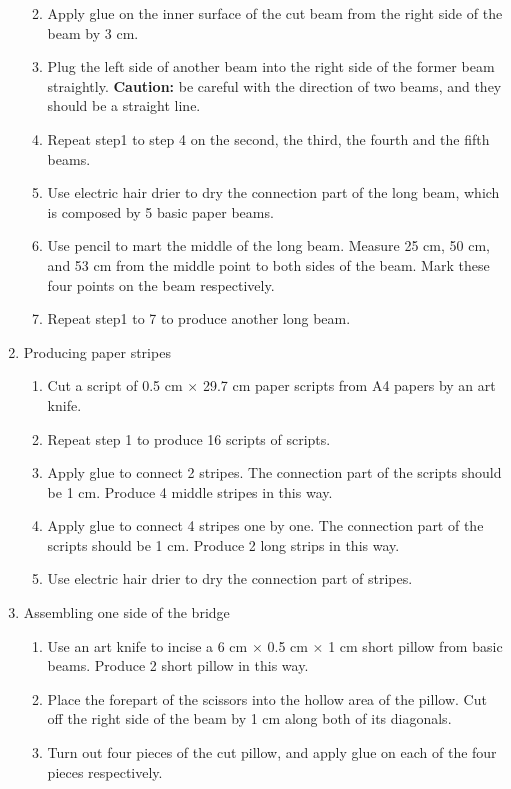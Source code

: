 \begin{enumerate}
\begin{enumerate}
\begin{figure}[H]
\begin{center}
	\end{center}
	\end{figure}
	\item Apply glue on the inner surface of the cut beam from the right side of the beam by 3 cm.
	\item Plug the left side of another beam into the right side of the former beam straightly. 
	\textbf{Caution:} be careful with the direction of two beams, and they should be a straight line. 
	\item Repeat step1 to step 4 on the second, the third, the fourth and the fifth beams. 
	\item Use electric hair drier to dry the connection part of the long beam, which is composed by 5 basic paper beams. 
	\item Use pencil to mart the middle of the long beam. Measure 25 cm, 50 cm, and 53 cm from the middle point to both sides of the beam. Mark these four points on the beam respectively. 
	\item Repeat step1 to 7 to produce another long beam. 
	\end{enumerate}
\item Producing paper stripes
	\begin{enumerate}
	\item Cut a script of 0.5 cm $\times$ 29.7 cm paper scripts from A4 papers by an art knife. 
	\item Repeat step 1 to produce 16 scripts of scripts.
	\item Apply glue to connect 2 stripes. The connection part of the scripts should be 1 cm. Produce 4 middle stripes in this way.
	\item Apply glue to connect 4 stripes one by one. The connection part of the scripts should be 1 cm. Produce 2 long strips in this way.
	\item Use electric hair drier to dry the connection part of stripes.
	\end{enumerate}
\item Assembling one side of the bridge
	\begin{enumerate}
	\item Use an art knife to incise a 6 cm $\times$ 0.5 cm $\times$ 1 cm short pillow from basic beams. Produce 2 short pillow in this way. 
	\item Place the forepart of the scissors into the hollow area of the pillow. Cut off the right side of the beam by 1 cm along both of its diagonals.
	\item Turn out four pieces of the cut pillow, and apply glue on each of the four pieces respectively.

\end{enumerate}
\end{enumerate}

